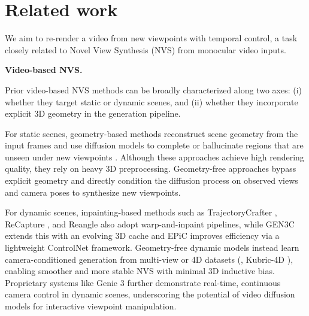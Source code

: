 \documentclass[10pt,twocolumn,letterpaper]{article}
\newcommand{\myparagraph}[1]{%
  \vspace{-0.05em}%
  \par\addvspace{0.4em}%
  \noindent\textbf{#1}\hspace{0.4em}%
}
\begin{document}


\section{Related work}

We aim to re-render a video from new viewpoints with temporal control, a task closely related to Novel View Synthesis (NVS) from monocular video inputs.




\myparagraph{Video-based NVS.}
Prior video-based NVS methods can be broadly characterized along two axes: (i) whether they target static or dynamic scenes, and (ii) whether they incorporate explicit 3D geometry in the generation pipeline.


For static scenes, geometry-based methods reconstruct scene geometry from the input frames and use diffusion models to complete or hallucinate regions that are unseen under new viewpoints \cite{yu2024viewcrafter,Ren2025,Jeong2025,wu2025video}.
Although these approaches achieve high rendering quality, they rely on heavy 3D preprocessing.
Geometry-free approaches \cite{Bai2025,Zhou2025,vanhoorick2024gcd} bypass explicit geometry and directly condition the diffusion process on observed views and camera poses to synthesize new viewpoints.


For dynamic scenes, inpainting-based methods such as TrajectoryCrafter \cite{YU2025}, ReCapture \cite{Zhang2024}, and Reangle \cite{Jeong2025} also adopt warp-and-inpaint pipelines, while GEN3C \cite{Ren2025} extends this with an evolving 3D cache and EPiC \cite{zun2025epic} improves efficiency via a lightweight ControlNet framework.
Geometry-free dynamic models \cite{Bai2025,bai2024syncammaster,vanhoorick2024gcd, wang20254realv2, Wang_2025_CVPR} instead learn camera-conditioned generation from multi-view or 4D datasets (\eg, Kubric-4D \cite{greff2021kubric}), enabling smoother and more stable NVS with minimal 3D inductive bias.
Proprietary systems like Genie 3 \cite{parker-holder2025genie3} further demonstrate real-time, continuous camera control in dynamic scenes, underscoring the potential of video diffusion models for interactive viewpoint manipulation.
\end{document}
